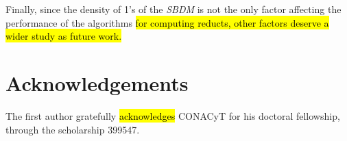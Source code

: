 \documentclass[number,preprint,review,12pt]{elsarticle}
\begin{document}
	Finally, since the density of 1's of the \textit{SBDM} is not the only factor affecting the performance of the algorithms \hl{for computing reducts, other factors deserve a wider study as future work.}

\section{Acknowledgements}
	The first author gratefully \hl{acknowledges} CONACyT for his doctoral fellowship, through the scholarship 399547.
{}

\end{document}
